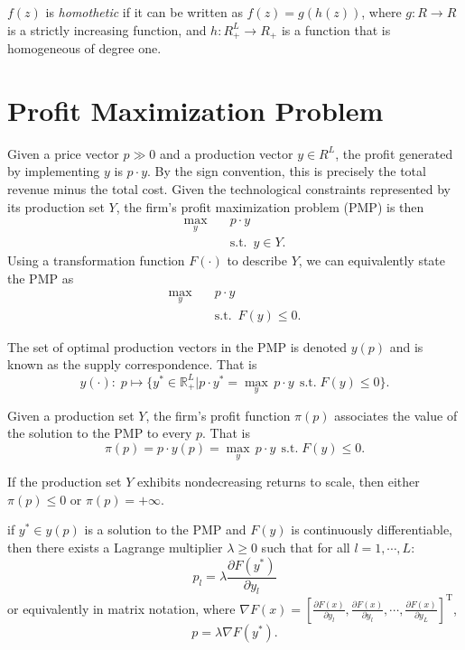 \documentclass[12pt,fleqn]{book} %
\begin{document}
\begin{definition}[Homotheticity]
	$f (z)$ is \emph{homothetic} if it can be written as $f (z) = g(h(z))$, where $g : R\rightarrow R$ is a strictly increasing function, and $h : R_+^L\rightarrow R_+$ is a function
	that is homogeneous of degree one.	
\end{definition}


\section{Profit Maximization Problem}
Given a price vector $p \gg 0$ and a production vector $y\in R^L$, the profit generated by implementing $y$ is $p\cdot y$. By the sign convention, this is precisely the total revenue minus the total cost. Given the technological constraints represented by its production set $Y$, the firm's profit maximization problem (PMP) is then
\begin{align*}
\max_{y} \quad &  p\cdot y\\
& \mathrm{s.t.}\ \; y\in Y.
\end{align*}
Using a transformation function $F(\cdot)$ to describe $Y$, we can equivalently state the PMP as
\begin{align*}
\max_{y} \quad &  p\cdot y\\
& \mathrm{s.t.}\ \; F(y)\le0.
\end{align*}

\begin{definition}
	The set of optimal production vectors in the PMP is denoted $y(p)$ and is known as the supply correspondence. That is
	\[
	y(\cdot):\;p\mapsto \{y^*\in\mathbb{R}_+^L|p\cdot y^*=\max_{y}\, p\cdot y\ \ \mathrm{s.t.}\;F(y)\le0\}.
	\]	
\end{definition}

\begin{definition}
	Given a production set $Y$, the firm's profit function $\pi(p)$ associates the value of the solution to the PMP to every $p$. That is
	\[
	\pi(p)=p\cdot y(p)=\max_{y}\, p\cdot y\ \ \mathrm{s.t.}\; F(y)\le0.
	\]
\end{definition}

\begin{proposition}
	If the production set $Y$ exhibits nondecreasing returns to scale, then either $\pi(p)\le 0$ or $\pi(p)=+\infty$.
\end{proposition}

\begin{theorem}
	if $y^* \in y(p)$ is a solution to the PMP and $F(y)$ is continuously differentiable, then there exists a
	Lagrange multiplier $\lambda\ge0$ such that for all $l = 1,\cdots, L$:
	\[
	p_l=\lambda\frac{\partial F(y^*)}{\partial y_l}
	\]
	or equivalently in matrix notation, where $\nabla F(x)= \left[\frac{\partial F(x)}{\partial y_l},\frac{\partial F(x)}{\partial y_l},\cdots,\frac{\partial F(x)}{\partial y_L} \right]^\mathrm{T}$,
    \[
    p=\lambda\nabla F(y^*).
    \]
\end{theorem}
\end{document}
